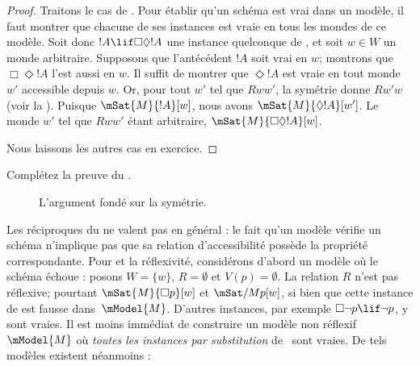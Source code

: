 \documentclass[../../../include/open-logic-section]{subfiles}
\begin{document}
\begin{proof}
  Traitons le cas de . Pour établir qu'un schéma est vrai
  dans un modèle, il faut montrer que chacune de ses instances
  est vraie en tous les mondes de ce modèle. Soit donc
  $!A \lif \Box\Diamond !A$ une instance quelconque de ,
  et soit $w \in W$ un monde arbitraire. Supposons que
  l'antécédent $!A$ soit vrai en $w$; montrons que
  $\Box \Diamond !A$ l'est aussi en $w$. Il suffit de montrer
  que $\Diamond !A$ est vraie en tout monde $w'$ accessible
  depuis $w$. Or, pour tout $w'$ tel que $Rww'$, la symétrie
  donne $Rw'w$ (voir la ). Puisque
  $\mSat{M}{!A}[w]$, nous avons
  $\mSat{M}{\Diamond !A}[w']$. Le monde $w'$ tel que $Rww'$
  étant arbitraire, $\mSat{M}{\Box\Diamond!A}[w]$.

  Nous laissons les autres cas en exercice.
\end{proof}

\begin{prob}
  Complétez la preuve du
  .
\end{prob}

\begin{figure}
  \begin{center}
  \end{center}
\caption{L'argument fondé sur la symétrie.}
\end{figure}

Les réciproques du  ne valent pas en général :
le fait qu'un modèle vérifie un schéma n'implique pas que sa
relation d'accessibilité possède la propriété correspondante.
Pour  et la réflexivité, considérons d'abord un modèle
où le schéma échoue : posons $W = \{w\}$,
$R = \emptyset$ et $V(p) = \emptyset$. La relation $R$
n'est pas réflexive; pourtant $\mSat{M}{\Box p}[w]$ et
$\mSat/{M}{p}[w]$, si bien que cette instance de 
est fausse dans~$\mModel{M}$. D'autres instances, par exemple
$\Box \lnot p \lif \lnot p$, y sont vraies. Il est moins
immédiat de construire un modèle non réflexif~$\mModel{M}$
où \emph{toutes les instances par substitution} de~
sont vraies. De tels modèles existent néanmoins :
\end{document}
